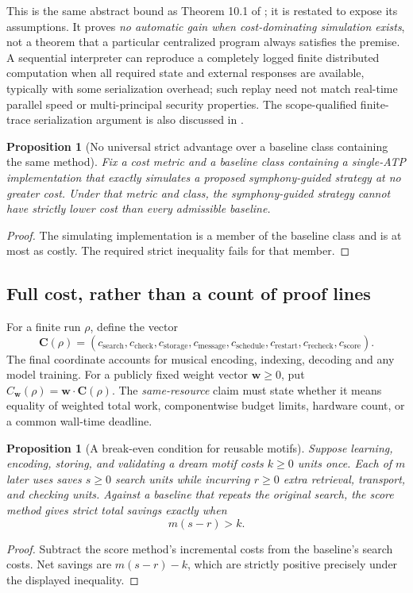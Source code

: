 \documentclass[11pt,letterpaper]{article}
\newtheorem{proposition}[theorem]{Proposition}
\theoremstyle{definition}
\theoremstyle{remark}
\begin{document}
This is the same abstract bound as Theorem 10.1 of \cite{tenneson-dreaming}; it is restated to expose its assumptions. It proves \emph{no automatic gain when cost-dominating simulation exists}, not a theorem that a particular centralized program always satisfies the premise. A sequential interpreter can reproduce a completely logged finite distributed computation when all required state and external responses are available, typically with some serialization overhead; such replay need not match real-time parallel speed or multi-principal security properties. The scope-qualified finite-trace serialization argument is also discussed in \cite{tenneson-wcf}.

\begin{proposition}[No universal strict advantage over a baseline class containing the same method]
Fix a cost metric and a baseline class containing a single-ATP implementation that exactly simulates a proposed symphony-guided strategy at no greater cost. Under that metric and class, the symphony-guided strategy cannot have strictly lower cost than \emph{every} admissible baseline.
\end{proposition}
\begin{proof}
The simulating implementation is a member of the baseline class and is at most as costly. The required strict inequality fails for that member.
\end{proof}

\subsection{Full cost, rather than a count of proof lines}
For a finite run $\rho$, define the vector
\begin{equation}\label{eq:ledger}
\mathbf C(\rho)=(c_{\mathrm{search}},c_{\mathrm{check}},c_{\mathrm{storage}},c_{\mathrm{message}},c_{\mathrm{schedule}},c_{\mathrm{restart}},c_{\mathrm{recheck}},c_{\mathrm{score}}).
\end{equation}
The final coordinate accounts for musical encoding, indexing, decoding and any model training. For a publicly fixed weight vector $\mathbf w\ge0$, put $C_{\mathbf w}(\rho)=\mathbf w\cdot\mathbf C(\rho)$. The \emph{same-resource} claim must state whether it means equality of weighted total work, componentwise budget limits, hardware count, or a common wall-time deadline.

\begin{proposition}[A break-even condition for reusable motifs]
Suppose learning, encoding, storing, and validating a dream motif costs $k\ge0$ units once. Each of $m$ later uses saves $s\ge0$ search units while incurring $r\ge0$ extra retrieval, transport, and checking units. Against a baseline that repeats the original search, the score method gives strict total savings exactly when
\[
\boxed{m(s-r)>k.}
\]
\end{proposition}
\begin{proof}
Subtract the score method's incremental costs from the baseline's search costs. Net savings are $m(s-r)-k$, which are strictly positive precisely under the displayed inequality.
\end{proof}
\end{document}
